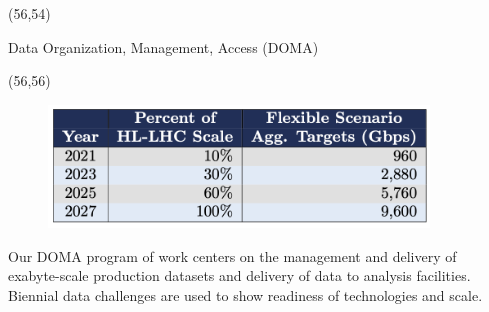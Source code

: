 \begin{textblock}{25.0}(56,54)
\begin{block}{Data Organization, Management, Access (DOMA)}
\begin{textblock}{25.0}(56,56)
\begin{figure}[tbph]
\centering
\includegraphics[width=0.90\textwidth]{images/doma-scale-challenges.png}
\end{figure}
Our DOMA program of work centers on the management and delivery of exabyte-scale production datasets and delivery of data to analysis facilities. Biennial data challenges are used to show readiness of technologies and scale.
\end{textblock}
\end{block}
\end{textblock}

